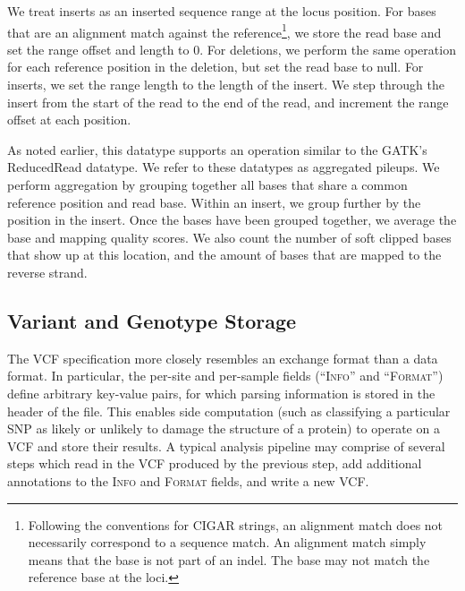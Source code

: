 \documentclass[10pt,twocolumn]{article}
\theoremstyle{plain}
\begin{document}
We treat inserts as an inserted sequence range at the locus position. For bases that are an alignment match against the
reference\footnote{Following the conventions for CIGAR strings, an alignment match does not necessarily correspond to
a sequence match. An alignment match simply means that the base is not part of an indel. The base may not match the
reference base at the loci.}, we store the read base and set the range offset and length to 0. For deletions, we perform the
same operation for each reference position in the deletion, but set the read base to null. For inserts, we set the range length
to the length of the insert. We step through the insert from the start of the read to the end of the read, and increment the
range offset at each position.

As noted earlier, this datatype supports an operation similar to the GATK's ReducedRead datatype. We refer to these datatypes
as aggregated pileups. We perform aggregation by grouping together all bases that share a common reference position and
read base. Within an insert, we group further by the position in the insert. Once the bases have been grouped together, we average
the base and mapping quality scores. We also count the number of soft clipped bases that show up at this location, and the amount
of bases that are mapped to the reverse strand.

\subsection{Variant and Genotype Storage}
\label{sec:variant-and-genotype-storage}

The VCF specification more closely resembles an exchange format than a data format. In particular, the per-site and per-sample fields
(``\textsc{Info}'' and ``\textsc{Format}'') define arbitrary key-value pairs, for which parsing information is stored in the header of the file.
This enables side computation (such as classifying a particular SNP as likely or unlikely to damage the structure of a protein) to operate on a VCF
and store their results. A typical analysis pipeline may comprise of several steps which read in the VCF produced by the previous step, add
additional annotations to the \textsc{Info} and \textsc{Format} fields, and write a new VCF.
\end{document}
